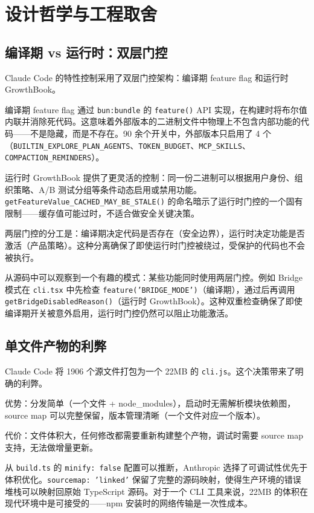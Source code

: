 \chapter{设计哲学与工程取舍}

\section{编译期 vs 运行时：双层门控}

Claude Code 的特性控制采用了双层门控架构：编译期 feature flag 和运行时 GrowthBook。

编译期 feature flag 通过 \texttt{bun:bundle} 的 \texttt{feature()} API 实现，在构建时将布尔值内联并消除死代码。这意味着外部版本的二进制文件中物理上不包含内部功能的代码——不是隐藏，而是不存在。90 余个开关中，外部版本只启用了 4 个（\texttt{BUILTIN\_EXPLORE\_PLAN\_AGENTS}、\texttt{TOKEN\_BUDGET}、\texttt{MCP\_SKILLS}、\texttt{COMPACTION\_REMINDERS}）。

运行时 GrowthBook 提供了更灵活的控制：同一份二进制可以根据用户身份、组织策略、A/B 测试分组等条件动态启用或禁用功能。\texttt{getFeatureValue\_CACHED\_MAY\_BE\_STALE()} 的命名暗示了运行时门控的一个固有限制——缓存值可能过时，不适合做安全关键决策。

两层门控的分工是：编译期决定代码是否存在（安全边界），运行时决定功能是否激活（产品策略）。这种分离确保了即使运行时门控被绕过，受保护的代码也不会被执行。

从源码中可以观察到一个有趣的模式：某些功能同时使用两层门控。例如 Bridge 模式在 \texttt{cli.tsx} 中先检查 \texttt{feature('BRIDGE\_MODE')}（编译期），通过后再调用 \texttt{getBridgeDisabledReason()}（运行时 GrowthBook）。这种双重检查确保了即使编译期开关被意外启用，运行时门控仍然可以阻止功能激活。

\section{单文件产物的利弊}

Claude Code 将 1906 个源文件打包为一个 22MB 的 \texttt{cli.js}。这个决策带来了明确的利弊。

优势：分发简单（一个文件 + node\_modules），启动时无需解析模块依赖图，source map 可以完整保留，版本管理清晰（一个文件对应一个版本）。

代价：文件体积大，任何修改都需要重新构建整个产物，调试时需要 source map 支持，无法做增量更新。

从 \texttt{build.ts} 的 \texttt{minify: false} 配置可以推断，Anthropic 选择了可调试性优先于体积优化。\texttt{sourcemap: 'linked'} 保留了完整的源码映射，使得生产环境的错误堆栈可以映射回原始 TypeScript 源码。对于一个 CLI 工具来说，22MB 的体积在现代环境中是可接受的——npm 安装时的网络传输是一次性成本。

